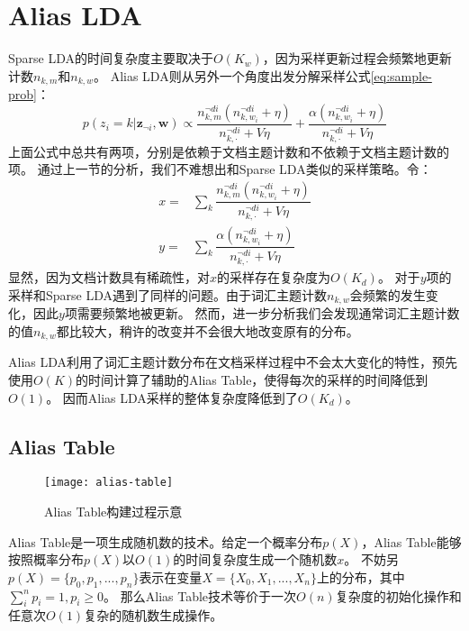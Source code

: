 \section{Alias LDA}
Sparse LDA的时间复杂度主要取决于$O(K_w)$，因为采样更新过程会频繁地更新计数$n_{k, m}$和$n_{k, w}$。
Alias LDA则从另外一个角度出发分解采样公式\ref{eq:sample-prob}：
\begin{equation}
\label{eq:sparse-sample-prob}
p( z_i = k | \mathbf{z}_{\neg i},  \mathbf{w}) 
	\propto   \dfrac{  n_{k, m}^{\neg di}(n_{k, w_i}^{\neg di} + \eta) }{ n_{k, \cdot}^{\neg di} + V\eta} +
\dfrac{\alpha( n_{k, w_i}^{\neg di} + \eta) }{ n_{k, \cdot}^{\neg di} + V\eta} 
\end{equation}
上面公式中总共有两项，分别是依赖于文档主题计数和不依赖于文档主题计数的项。
通过上一节的分析，我们不难想出和Sparse LDA类似的采样策略。令：
\begin{align}
x = & \sum_k {\dfrac{n_{k, m}^{\neg di}(n_{k, w_i}^{\neg di} + \eta) }{ n_{k,\cdot}^{\neg di} + V\eta}}\\
y = & \sum_k {\dfrac{\alpha( n_{k, w_i}^{\neg di} + \eta) }{ n_{k, \cdot}^{\neg di} + V\eta} }
\end{align}
显然，因为文档计数具有稀疏性，对$x$的采样存在复杂度为$O(K_d)$。
对于$y$项的采样和Sparse LDA遇到了同样的问题。由于词汇主题计数$n_{k, w}$会频繁的发生变化，因此$y$项需要频繁地被更新。
然而，进一步分析我们会发现通常词汇主题计数的值$n_{k, w}$都比较大，稍许的改变并不会很大地改变原有的分布。

Alias LDA利用了词汇主题计数分布在文档采样过程中不会太大变化的特性，预先使用$O(K)$的时间计算了辅助的Alias Table，使得每次的采样的时间降低到$O(1)$。
因而Alias LDA采样的整体复杂度降低到了$O(K_d)$。

\subsection{Alias Table}
\begin{figure}[htb]\centering
\texttt{[image: alias-table]}
\caption{Alias Table构建过程示意}
\label{fig:alias-table}       %
\end{figure}
Alias Table\cite{vose1991a}是一项生成随机数的技术。给定一个概率分布$p(X)$，Alias Table能够按照概率分布$p(X)$以$O(1)$的时间复杂度生成一个随机数$x$。
不妨另$p(X) = \{p_0, p_1, ..., p_n\}$表示在变量$X=\{X_0, X_1, ..., X_n\}$上的分布，其中$\sum_i^n {p_i} = 1, p_i \ge 0$。
那么Alias Table技术等价于一次$O(n)$复杂度的初始化操作和任意次$O(1)$复杂的随机数生成操作。

